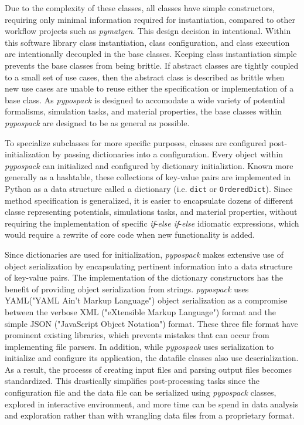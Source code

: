 Due to the complexity of these classes, all classes have simple constructors, requiring only minimal information required for instantiation, compared to other workflow projects such as \emph{pymatgen}.  This design decision in intentional.  Within this software library class instantiation, class configuration, and class execution are intentionally decoupled in the base classes.  Keeping class instantiation simple prevents the base classes from being brittle.  If abstract classes are tightly coupled to a small set of use cases, then the abstract class is described as brittle when new use cases are unable to reuse either the specification or implementation of a base class.  As \emph{pypospack} is designed to accomodate a wide variety of potential formalisms, simulation tasks, and material properties, the base classes within \emph{pypospack} are designed to be as general as possible.

To specialize subclasses for more specific purposes, classes are configured post-initialization by passing dictionaries into a configuration.  Every object within \emph{pypospack} can initialized and configured by dictionary initializtion.  Known more generally as a hashtable, these collections of key-value pairs are implemented in Python as a data structure called a dictionary (i.e. \verb|dict| or \verb|OrderedDict|).
  Since method specification is generalized, it is easier to encapsulate dozens of different classe representing potentials, simulations tasks, and material properties, without requiring the implementation of specific \emph{if}-\emph{else if}-\emph{else} idiomatic expressions, which would require a rewrite of core code when new functionality is added.

Since dictionaries are used for initialization, \emph{pypospack} makes extensive use of object serialization by encapsulating pertinent information into a data structure of key-value pairs.
The implementation of the dictionary constructors has the benefit of providing object serialization from strings.  \emph{pypospack} uses YAML("YAML Ain't Markup Language") object serialization as a compromise between the verbose XML ("eXtensible Markup Language") format and the simple JSON ("JavaScript Object Notation") format.  These three file format have prominent existing libraries, which prevents mistakes that can occur from implementing file parsers.
In addition, while \emph{pypospack} uses serialization to initialize and configure its application, the datafile classes also use deserialization.  As a result, the processs of creating input files and parsing output files becomes standardized.  This drastically simplifies post-processing tasks since the configuration file and the data file can be serialized using \emph{pypospack} classes, explored in interactive environment, and more time can be spend in data analysis and exploration rather than with wrangling data files from a proprietary format.

